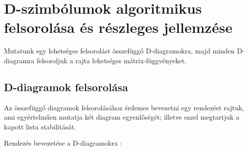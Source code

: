 \documentclass[12pt,magyar,a4paper]{article}
\begin{document}
\section{D-szimbólumok algoritmikus felsorolása és részleges jellemzése}
Mutatunk egy lehetséges felsorolást összefüggő D-diagramokra, majd minden D-diagramra
felsoroljuk a rajta lehetséges mátrix-függvényeket.

\subsection{D-diagramok felsorolása}
Az összefüggő diagramok felsorolásához érdemes bevezetni egy rendezést rajtuk,
ami egyértelműen mutatja két diagram egyenlőségét; illetve ezzel megtartjuk a
kapott lista stabilitását.

Rendezés bevezetése a D-diagramokra \cite{Emil}:
\end{document}
